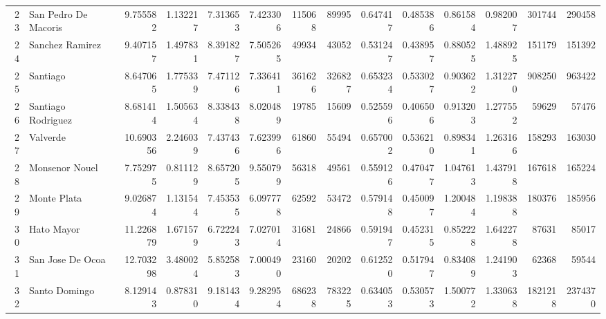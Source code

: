 \begin{tabular}{rlrrrrrrrrrrrr}
   23 &    San Pedro De Macoris &   9.755582 &  1.132217 &   7.313653 &   7.423306 &     115068 &      89995 &     0.647417 &     0.485386 &    0.861584 &    0.982007 &   301744 &   290458 \\
   24 &         Sanchez Ramirez &   9.407157 &  1.497831 &   8.391827 &   7.505265 &      49934 &      43052 &     0.531247 &     0.438957 &    0.880525 &    1.488925 &   151179 &   151392 \\
   25 &                Santiago &   8.647065 &  1.775339 &   7.471126 &   7.336411 &     361626 &     326827 &     0.653234 &     0.533027 &    0.903622 &    1.312270 &   908250 &   963422 \\
   26 &      Santiago Rodriguez &   8.681414 &  1.505634 &   8.338438 &   8.020489 &      19785 &      15609 &     0.525596 &     0.406506 &    0.913203 &    1.277552 &    59629 &    57476 \\
   27 &                Valverde &  10.690356 &  2.246039 &   7.437436 &   7.623996 &      61860 &      55494 &     0.657002 &     0.536210 &    0.898341 &    1.263166 &   158293 &   163030 \\
   28 &          Monsenor Nouel &   7.752975 &  0.811129 &   8.657205 &   9.550799 &      56318 &      49561 &     0.559126 &     0.470477 &    1.047613 &    1.437918 &   167618 &   165224 \\
   29 &             Monte Plata &   9.026874 &  1.131544 &   7.453535 &   6.097778 &      62592 &      53472 &     0.579148 &     0.450097 &    1.200484 &    1.198388 &   180376 &   185956 \\
   30 &              Hato Mayor &  11.226879 &  1.671579 &   6.722243 &   7.027014 &      31681 &      24866 &     0.591947 &     0.452315 &    0.852228 &    1.642278 &    87631 &    85017 \\
   31 &        San Jose De Ocoa &  12.703298 &  3.480024 &   5.852583 &   7.000490 &      23160 &      20202 &     0.612520 &     0.517947 &    0.834089 &    1.241903 &    62368 &    59544 \\
   32 &           Santo Domingo &   8.129143 &  0.878310 &   9.181434 &   9.282954 &     686238 &     783225 &     0.634053 &     0.530573 &    1.500772 &    1.330638 &  1821218 &  2374370 \\
\bottomrule
\end{tabular}
